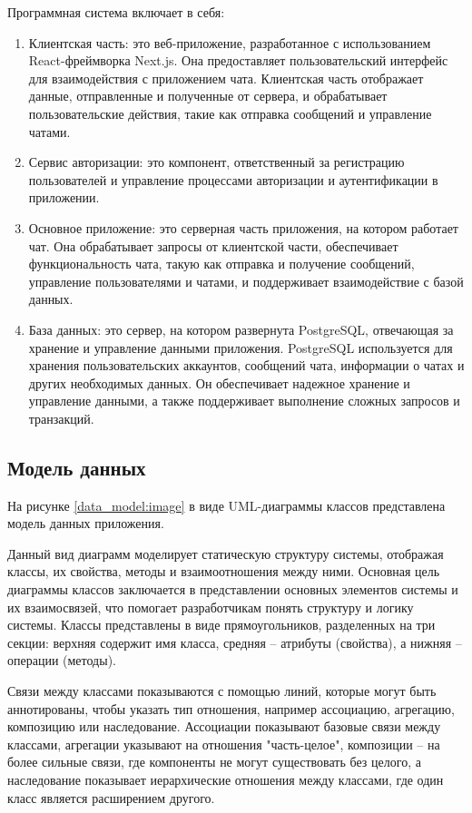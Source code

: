 Программная система включает в себя:
\begin{enumerate}
		\item Клиентская часть: это веб-приложение, разработанное с использованием React-фреймворка Next.js. Она предоставляет пользовательский интерфейс для взаимодействия с приложением чата. Клиентская часть отображает данные, отправленные и полученные от сервера, и обрабатывает пользовательские действия, такие как отправка сообщений и управление чатами.
			
		\item Сервис авторизации: это компонент, ответственный за регистрацию пользователей и управление процессами авторизации и аутентификации в приложении. 
		
		\item Основное приложение: это серверная часть приложения, на котором работает чат. Она обрабатывает запросы от клиентской части, обеспечивает функциональность чата, такую как отправка и получение сообщений, управление пользователями и чатами, и поддерживает взаимодействие с базой данных.
		
		\item База данных: это сервер, на котором развернута PostgreSQL, отвечающая за хранение и управление данными приложения. PostgreSQL используется для хранения пользовательских аккаунтов, сообщений чата, информации о чатах и других необходимых данных. Он обеспечивает надежное хранение и управление данными, а также поддерживает выполнение сложных запросов и транзакций\cite{db}.
\end{enumerate}

\subsection{Модель данных}

На рисунке \ref{data_model:image} в виде UML-диаграммы классов представлена модель данных приложения.

Данный вид диаграмм моделирует статическую структуру системы, отображая классы, их свойства, методы и взаимоотношения между ними. Основная цель диаграммы классов заключается в представлении основных элементов системы и их взаимосвязей, что помогает разработчикам понять структуру и логику системы. Классы представлены в виде прямоугольников, разделенных на три секции: верхняя содержит имя класса, средняя – атрибуты (свойства), а нижняя – операции (методы).

Связи между классами показываются с помощью линий, которые могут быть аннотированы, чтобы указать тип отношения, например ассоциацию, агрегацию, композицию или наследование. Ассоциации показывают базовые связи между классами, агрегации указывают на отношения "часть-целое", композиции – на более сильные связи, где компоненты не могут существовать без целого, а наследование показывает иерархические отношения между классами, где один класс является расширением другого.

